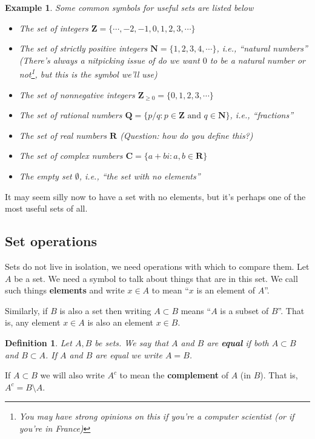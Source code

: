 \documentclass[12pt]{article}
\numberwithin{equation}{subsection}
\newtheorem{defn}[subsection]{Definition}
\theoremstyle{note}
\newtheorem{example}[subsection]{Example}
\begin{document}
\begin{example} Some common symbols for useful sets are listed below
\begin{itemize}
	\item The set of integers $\mathbf{Z}=\{\cdots, -2, -1, 0, 1, 2, 3, \cdots\}$
	\item The set of strictly positive integers $\mathbf{N}=\{1,2,3,4,\cdots\}$, i.e.,  ``natural numbers'' (There's always a nitpicking issue of do we want $0$ to be a natural number or not\footnote{You may have strong opinions on this if you're a computer scientist (or if you're in France)}, but this is the symbol we'll use)
	\item The set of nonnegative integers $\mathbf{Z}_{\geq 0}=\{0,1,2,3,\cdots\}$
	\item The set of rational numbers $\mathbf{Q}=\{ p/q : p\in \mathbf{Z} \text{ and } q\in \mathbf{N} \}$, i.e., ``fractions''
	\item The set of real numbers $\mathbf{R}$ (\textit{Question: how do you define this?})
	\item The set of complex numbers $\mathbf{C}=\{ a+bi : a, b \in \mathbf{R}\}$
	\item The empty set $\emptyset$, i.e., ``the set with no elements'' 
\end{itemize}
\end{example} 
It may seem silly now to have a set with no elements, but it's perhaps one of the most useful sets of all. 

\subsection{Set operations} 
Sets do not live in isolation, we need operations with which to compare them. Let $A$ be a set. We need a symbol to talk about things that are in this set. We call such things \textbf{elements} and write $x\in A$ to mean ``$x$ is an element of $A$''. 

Similarly, if  $B$ is also a set then writing $A\subset B$ means ``$A$ is a subset of $B$''. That is, any element $x\in A$ is also an element $x\in B$. 

\begin{defn}
Let $A,B$ be sets. We say that $A$ and $B$ are \textbf{equal} if both $A\subset B$ and $B\subset A$. If $A$ and $B$ are equal we write $A=B$.
\end{defn}


If $A\subset B$ we will also write $A^{c}$ to mean the \textbf{complement} of $A$ (in $B$). That is, $A^{c}=B\setminus A$.
\end{document}
